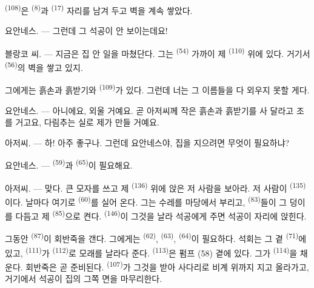  \textsuperscript{(108)}은  \textsuperscript{(8)}과 
\textsuperscript{(17)} 자리를 남겨 두고 벽을 계속 쌓았다.

\textsc{요안네스}. --- 그런데 그 석공이 안 보이는데요!

\textsc{블랑코} 씨. --- 지금은 집 안 일을 마쳤단다. 그는 
\textsuperscript{(54)} 가까이 제  \textsuperscript{(110)} 위에 있다. 거기서
 \textsuperscript{(56)}의 벽을 쌓고 있지.

그에게는 흙손과 흙받기와  \textsuperscript{(109)}가 있다. 그런데 너는 그
이름들을 다 외우지 못할 게다.

\textsc{요안네스}. --- 아니에요, 외울 거예요. 곧 아저씨께 작은 흙손과 흙받기를 사
달라고 조를 거고요, 다림추는 실로 제가 만들 거예요.

\VUsaut{3.0mm}
\VUsaut{3.0mm}

\textsc{아저씨}. --- 하! 아주 좋구나. 그런데 요안네스야, 집을 지으려면 무엇이 필요하냐?

\textsc{요안네스}. ---  \textsuperscript{(59)}과 
\textsuperscript{(65)}이 필요해요.

\textsc{아저씨}. --- 맞다. 큰 모자를 쓰고 제  \textsuperscript{(136)} 위에
앉은 저 사람을 보아라. 저 사람이  \textsuperscript{(135)}이다. 날마다
여기로  \textsuperscript{(60)}를 실어 온다. 그는 수레를 마당에서 부리고,
 \textsuperscript{(83)}들이 그 덩이를 다듬고 제 
\textsuperscript{(85)}으로 켠다.  \textsuperscript{(146)}이 그것을 날라
석공에게 주면 석공이 자리에 앉힌다.

그동안  \textsuperscript{(87)}이 회반죽을 갠다. 그에게는 
\textsuperscript{(62)},  \textsuperscript{(63)}, 
\textsuperscript{(64)}이 필요하다. 석회는 그 곁  \textsuperscript{(71)}에
있고,  \textsuperscript{(111)}가  \textsuperscript{(112)}로
모래를 날라다 준다.  \textsuperscript{(113)}은 펌프 (58) 곁에 있다. 그가
 \textsuperscript{(114)}을 채운다. 회반죽은 곧 준비된다.
 \textsuperscript{(107)}가 그것을 받아 사다리로 비계 위까지
지고 올라가고, 거기에서 석공이 집의 그쪽 면을 마무리한다.

